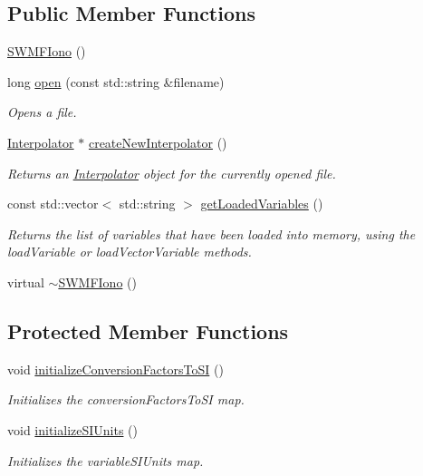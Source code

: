 \subsection*{Public Member Functions}
\begin{DoxyCompactItemize}
\item 
\hyperlink{classccmc_1_1_s_w_m_f_iono_a2af98741608e42f05e0a5c1b9e8bb412}{S\-W\-M\-F\-Iono} ()
\item 
long \hyperlink{classccmc_1_1_s_w_m_f_iono_ad9e939763ca7026d551925d83c9f1425}{open} (const std\-::string \&filename)
\begin{DoxyCompactList}\small\item\em Opens a file. \end{DoxyCompactList}\item 
\hyperlink{classccmc_1_1_interpolator}{Interpolator} $\ast$ \hyperlink{classccmc_1_1_s_w_m_f_iono_a53d2bdb34290a7c9da48982f7262762c}{create\-New\-Interpolator} ()
\begin{DoxyCompactList}\small\item\em Returns an \hyperlink{classccmc_1_1_interpolator}{Interpolator} object for the currently opened file.  \end{DoxyCompactList}\item 
const std\-::vector$<$ std\-::string $>$ \hyperlink{classccmc_1_1_s_w_m_f_iono_aa36f1447a732be36bf98722e8e22caee}{get\-Loaded\-Variables} ()
\begin{DoxyCompactList}\small\item\em Returns the list of variables that have been loaded into memory, using the load\-Variable or load\-Vector\-Variable methods. \end{DoxyCompactList}\item 
virtual \hyperlink{classccmc_1_1_s_w_m_f_iono_abfae78a79ffb7e59eb8cba61dda20b7c}{$\sim$\-S\-W\-M\-F\-Iono} ()
\end{DoxyCompactItemize}
\subsection*{Protected Member Functions}
\begin{DoxyCompactItemize}
\item 
void \hyperlink{classccmc_1_1_s_w_m_f_iono_a19279179873a44a59bf71651d5aadd27}{initialize\-Conversion\-Factors\-To\-S\-I} ()
\begin{DoxyCompactList}\small\item\em Initializes the conversion\-Factors\-To\-S\-I map.  \end{DoxyCompactList}\item 
void \hyperlink{classccmc_1_1_s_w_m_f_iono_a20417d2b847bc12764ec3112d7166590}{initialize\-S\-I\-Units} ()
\begin{DoxyCompactList}\small\item\em Initializes the variable\-S\-I\-Units map.  \end{DoxyCompactList}\end{DoxyCompactItemize}
